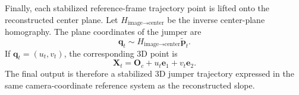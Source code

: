 Finally, each stabilized reference-frame trajectory point is lifted onto the reconstructed center plane. Let \(H_{\text{image}\rightarrow\text{center}}\) be the inverse center-plane homography. The plane coordinates of the jumper are
\[
\mathbf{q}_t \sim H_{\text{image}\rightarrow\text{center}}\tilde{\mathbf{p}}_t.
\]
If \(\mathbf{q}_t=(u_t,v_t)\), the corresponding 3D point is
\[
\mathbf{X}_t = \mathbf{O}_c + u_t\mathbf{e}_1 + v_t\mathbf{e}_2.
\]
The final output is therefore a stabilized 3D jumper trajectory expressed in the same camera-coordinate reference system as the reconstructed slope.
